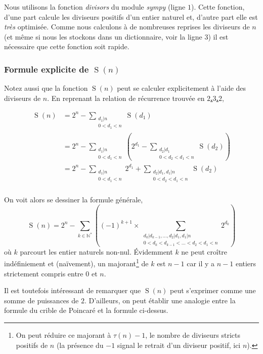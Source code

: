 \documentclass[a4paper,french,12pt]{article}
\begin{document}
Nous utilisons la fonction \emph{divisors} du module \emph{sympy} (ligne $1$). Cette fonction, d'une part calcule les diviseurs positifs d'un entier naturel et, d'autre part elle est \emph{très} optimisée. Comme nous calculons à de nombreuses reprises les diviseurs de $n$ (et même si nous les stockons dans un dictionnaire, voir la ligne $3$) il est nécessaire que cette fonction soit rapide.

\subsubsection{Formule explicite de $\operatorname{S}\left(n\right)$}

Notez aussi que la fonction $\operatorname{S}\left(n\right)$ peut se calculer explicitement à l'aide des diviseurs de $n$. En reprenant la relation de récurrence trouvée en \hyperlink{50}{\textbf{$2$.$3$.$2$}},

\begin{align*}
\operatorname{S}\left(n\right)&=2^{n}-\sum_{\substack{d_{1}|n \\ 0<d_{1}<n}}\operatorname{S}\left(d_{1}\right)\\
&=2^{n}-\sum_{\substack{d_{1}|n \\ 0<d_{1}<n}}\left(2^{d_{1}}-\sum_{\substack{d_{2}|d_{1}\\0<d_{2}<d_{1}<n}}\operatorname{S}\left(d_{2}\right)\right)\\
&=2^{n}-\sum_{\substack{d_{1}|n \\ 0<d_{1}<n}}2^{d_{1}}+\sum_{\substack{d_{2}|d_{1}, d_{1}|n\\0<d_{2}<d_{1}<n}}\operatorname{S}\left(d_{2}\right)\\
\end{align*}

On voit alors se dessiner la formule générale,
\[\operatorname{S}\left(n\right)=2^{n}-\sum_{k\in\mathbb{N}^*}\left(\left(-1\right)^{k+1}\times\sum_{\substack{d_{k}|d_{k-1},\ldots, d_{2}|d_{1},d_{1}|n\\ 0<d_{k}<d_{k-1}<\ldots<d_{2}<d_{1}<n}}2^{d_{k}}\right)\]
où $k$ parcourt les entier naturels non-nul. Évidemment $k$ ne peut croître indéfiniement et (naïvement), un majorant\footnote{On peut réduire ce majorant à $\tau\left(n\right)-1$, le nombre de diviseurs stricts positifs de $n$ (la présence du $-1$ signal le retrait d'un diviseur positif, ici $n$).} de $k$ est $n-1$ car il y a $n-1$ entiers strictement compris entre $0$ et $n$.

Il est toutefois intéressant de remarquer que $\operatorname{S}\left(n\right)$ peut s'exprimer comme une somme de puissances de $2$. D'ailleurs, on peut établir une analogie entre la formule du crible de Poincaré et la formule ci-dessus.
\end{document}
